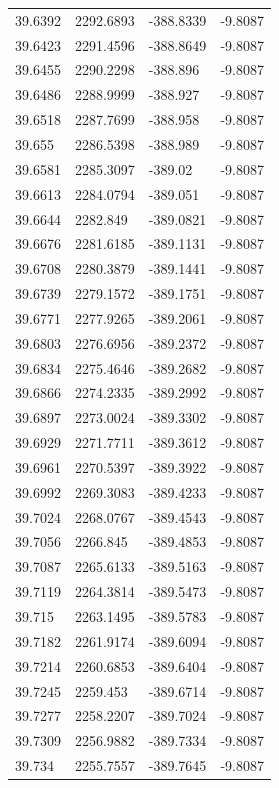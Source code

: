 \begin{table}[H]
\begin{tabular}{llll}
39.6392 & 2292.6893 & -388.8339 & -9.8087 \\
39.6423 & 2291.4596 & -388.8649 & -9.8087 \\
39.6455 & 2290.2298 & -388.896 & -9.8087 \\
39.6486 & 2288.9999 & -388.927 & -9.8087 \\
39.6518 & 2287.7699 & -388.958 & -9.8087 \\
39.655 & 2286.5398 & -388.989 & -9.8087 \\
39.6581 & 2285.3097 & -389.02 & -9.8087 \\
39.6613 & 2284.0794 & -389.051 & -9.8087 \\
39.6644 & 2282.849 & -389.0821 & -9.8087 \\
39.6676 & 2281.6185 & -389.1131 & -9.8087 \\
39.6708 & 2280.3879 & -389.1441 & -9.8087 \\
39.6739 & 2279.1572 & -389.1751 & -9.8087 \\
39.6771 & 2277.9265 & -389.2061 & -9.8087 \\
39.6803 & 2276.6956 & -389.2372 & -9.8087 \\
39.6834 & 2275.4646 & -389.2682 & -9.8087 \\
39.6866 & 2274.2335 & -389.2992 & -9.8087 \\
39.6897 & 2273.0024 & -389.3302 & -9.8087 \\
39.6929 & 2271.7711 & -389.3612 & -9.8087 \\
39.6961 & 2270.5397 & -389.3922 & -9.8087 \\
39.6992 & 2269.3083 & -389.4233 & -9.8087 \\
39.7024 & 2268.0767 & -389.4543 & -9.8087 \\
39.7056 & 2266.845 & -389.4853 & -9.8087 \\
39.7087 & 2265.6133 & -389.5163 & -9.8087 \\
39.7119 & 2264.3814 & -389.5473 & -9.8087 \\
39.715 & 2263.1495 & -389.5783 & -9.8087 \\
39.7182 & 2261.9174 & -389.6094 & -9.8087 \\
39.7214 & 2260.6853 & -389.6404 & -9.8087 \\
39.7245 & 2259.453 & -389.6714 & -9.8087 \\
39.7277 & 2258.2207 & -389.7024 & -9.8087 \\
39.7309 & 2256.9882 & -389.7334 & -9.8087 \\
39.734 & 2255.7557 & -389.7645 & -9.8087 \\

\end{tabular}
\end{table}
